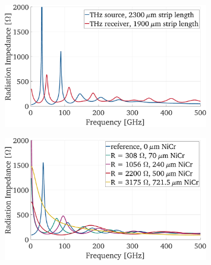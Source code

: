 \begin{figure}
    \centering
    \includegraphics[width=0.8\textwidth]{figures/appdx/rad_imp_source.pdf}
    \caption{}
    \label{appdx_sim_rad_imp_Tx}
\end{figure}

\begin{figure}
    \centering
    \includegraphics[width=0.8\textwidth]{figures/appdx/sim_rad_imp_I_Dipoles.pdf}
    \caption{}
    \label{appdx_sim_rad_imp_IDipoles}
\end{figure}
